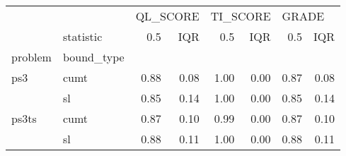 \begin{tabular}{llrrrrrr}
\toprule
      & {} & \multicolumn{2}{l}{QL\_SCORE} & \multicolumn{2}{l}{TI\_SCORE} & \multicolumn{2}{l}{GRADE} \\
      & statistic &      0.5 &  IQR &      0.5 &  IQR &   0.5 &  IQR \\
problem & bound\_type &          &      &          &      &       &      \\
\midrule
ps3 & cumt &     0.88 & 0.08 &     1.00 & 0.00 &  0.87 & 0.08 \\
      & sl &     0.85 & 0.14 &     1.00 & 0.00 &  0.85 & 0.14 \\
ps3ts & cumt &     0.87 & 0.10 &     0.99 & 0.00 &  0.87 & 0.10 \\
      & sl &     0.88 & 0.11 &     1.00 & 0.00 &  0.88 & 0.11 \\
\bottomrule
\end{tabular}
